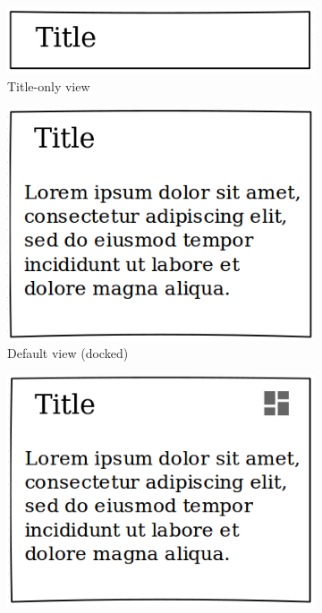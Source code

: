 \documentclass{sigchi}
\begin{document}
\begin{figure}
	\centering
	\begin{subfigure}{0.4\columnwidth}
		\includegraphics[width=\textwidth]{figures/widget-titleonly}
		\caption{Title-only view}
		\label{fig:widget-titleonly}
	\end{subfigure}%
	\hfill
	\begin{subfigure}{0.4\columnwidth}
		\includegraphics[width=\textwidth]{figures/widget-default-docked}
		\caption{Default view (docked)}
		\label{fig:widget-default-docked}
	\end{subfigure}
	\hfill
	\begin{subfigure}{0.4\columnwidth}
		\includegraphics[width=\textwidth]{figures/widget-default-undocked}

\end{subfigure}
\end{figure}
\end{document}

